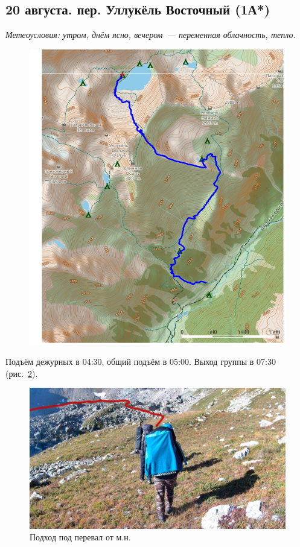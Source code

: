 \subsection{20 августа. пер. Уллукёль Восточный (1А*)}
\textit{Метеоусловия: утром, днём ясно, вечером~--- переменная облачность, тепло.}

\begin{figure}[h!]
	\centering
	\includegraphics[angle=0, width=0.7\linewidth]{../pics/mini_maps/20}
	\label{fig:mini_20}
\end{figure}

Подъём дежурных в 04:30, общий подъём в 05:00. Выход группы в 07:30 (рис.~\ref{fig:20aug1.jpg}).

\begin{figure}[h!]
	\centering
	\includegraphics[width=0.7\linewidth]{../pics/20aug1.jpg}
	\caption{Подход под перевал от м.н.}
	\label{fig:20aug1.jpg}
\end{figure}

